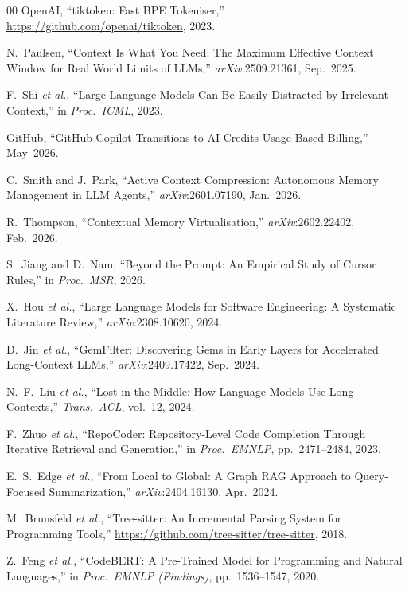 \documentclass[conference]{IEEEtran}
\begin{document}
\begin{thebibliography}{00}
OpenAI, ``tiktoken: Fast BPE Tokeniser,''
\url{https://github.com/openai/tiktoken}, 2023.

N.~Paulsen, ``Context Is What You Need: The Maximum Effective Context
Window for Real World Limits of LLMs,''
\emph{arXiv}:2509.21361, Sep.~2025.

F.~Shi \emph{et al.}, ``Large Language Models Can Be Easily Distracted
by Irrelevant Context,'' in \emph{Proc.\ ICML}, 2023.

GitHub, ``GitHub Copilot Transitions to AI Credits Usage-Based
Billing,'' May~2026.

C.~Smith and J.~Park, ``Active Context Compression: Autonomous Memory
Management in LLM Agents,'' \emph{arXiv}:2601.07190, Jan.~2026.

R.~Thompson, ``Contextual Memory Virtualisation,''
\emph{arXiv}:2602.22402, Feb.~2026.

S.~Jiang and D.~Nam, ``Beyond the Prompt: An Empirical Study of Cursor
Rules,'' in \emph{Proc.\ MSR}, 2026.

X.~Hou \emph{et al.}, ``Large Language Models for Software Engineering:
A Systematic Literature Review,'' \emph{arXiv}:2308.10620, 2024.

D.~Jin \emph{et al.}, ``GemFilter: Discovering Gems in Early Layers
for Accelerated Long-Context LLMs,''
\emph{arXiv}:2409.17422, Sep.~2024.

N.~F.~Liu \emph{et al.}, ``Lost in the Middle: How Language Models Use
Long Contexts,'' \emph{Trans.\ ACL}, vol.~12, 2024.

F.~Zhuo \emph{et al.}, ``RepoCoder: Repository-Level Code Completion
Through Iterative Retrieval and Generation,''
in \emph{Proc.\ EMNLP}, pp.~2471--2484, 2023.

E.~S.~Edge \emph{et al.}, ``From Local to Global: A Graph RAG Approach
to Query-Focused Summarization,''
\emph{arXiv}:2404.16130, Apr.~2024.

M.~Brunsfeld \emph{et al.}, ``Tree-sitter: An Incremental Parsing
System for Programming Tools,''
\url{https://github.com/tree-sitter/tree-sitter}, 2018.

Z.~Feng \emph{et al.}, ``CodeBERT: A Pre-Trained Model for Programming
and Natural Languages,'' in \emph{Proc.\ EMNLP (Findings)},
pp.~1536--1547, 2020.

\end{thebibliography}

\balance
\end{document}
